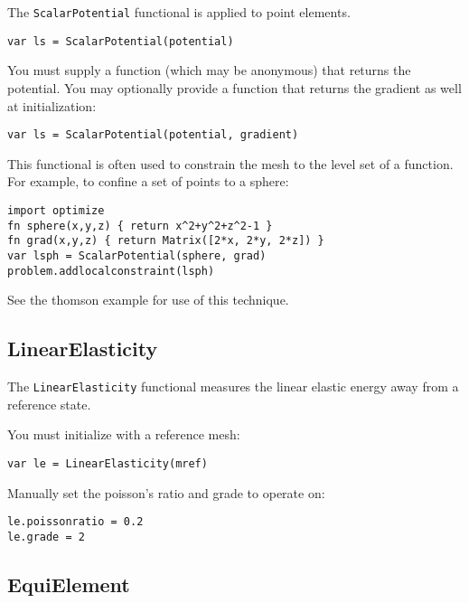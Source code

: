 The \texttt{ScalarPotential} functional is applied to point elements.

\begin{lstlisting}
var ls = ScalarPotential(potential)
\end{lstlisting}

You must supply a function (which may be anonymous) that returns the
potential. You may optionally provide a function that returns the
gradient as well at initialization:

\begin{lstlisting}
var ls = ScalarPotential(potential, gradient)
\end{lstlisting}

This functional is often used to constrain the mesh to the level set of
a function. For example, to confine a set of points to a sphere:

\begin{lstlisting}
import optimize
fn sphere(x,y,z) { return x^2+y^2+z^2-1 }
fn grad(x,y,z) { return Matrix([2*x, 2*y, 2*z]) }
var lsph = ScalarPotential(sphere, grad)
problem.addlocalconstraint(lsph)
\end{lstlisting}

See the thomson example for use of this technique.

\hypertarget{linearelasticity}{%
\subsection{LinearElasticity}\label{linearelasticity}}

The \texttt{LinearElasticity} functional measures the linear elastic
energy away from a reference state.

You must initialize with a reference mesh:

\begin{lstlisting}
var le = LinearElasticity(mref)
\end{lstlisting}

Manually set the poisson's ratio and grade to operate on:

\begin{lstlisting}
le.poissonratio = 0.2
le.grade = 2
\end{lstlisting}

\hypertarget{equielement}{%
\subsection{EquiElement}\label{equielement}}

